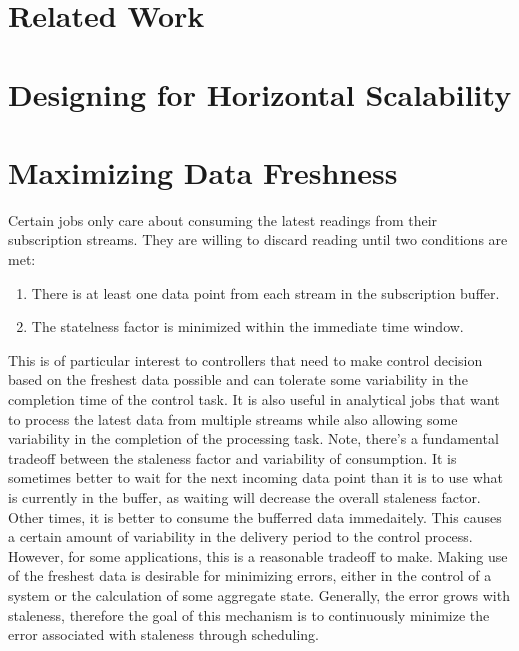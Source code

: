 \section{Related Work}
\section{Designing for Horizontal Scalability}

\section{Maximizing Data Freshness}
Certain jobs only care about consuming the latest readings from their subscription streams.  They are willing to discard reading until two
conditions are met:

\begin{enumerate}
\item There is at least one data point from each stream in the subscription buffer.
\item The statelness factor is minimized within the immediate time window.
\end{enumerate}

This is of particular interest to controllers that need to make control decision based on the freshest data possible and can tolerate some variability
in the completion time of the control task.  It is also useful in analytical jobs that want to process the latest data from multiple streams while also
allowing some variability in the completion of the processing task.  Note, there's a fundamental tradeoff
between the staleness factor and variability of consumption.  It is sometimes better to wait for the next incoming data point than it is to use what
is currently in the buffer, as waiting will decrease the overall staleness factor.  Other times, it is better to consume the bufferred data immedaitely.
This causes a certain amount of variability in the delivery period to the control process.  However, for some applications, this is a reasonable tradeoff
to make.  Making use of the freshest data is desirable for minimizing errors, either in the control of a system or the calculation of some aggregate state.
Generally, the error grows with staleness, therefore the goal of this mechanism is to continuously minimize the error associated with staleness through
scheduling.


